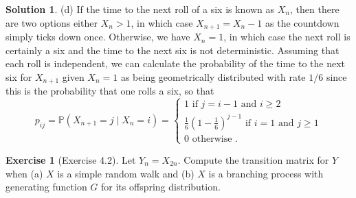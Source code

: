 \documentclass[12pt]{article}
\newcommand{\Prob}{\mathbb{P}}
\theoremstyle{definition}
\newtheorem{exer}{Exercise}
\newtheorem{sol}{Solution}
\theoremstyle{remark}
\begin{document}
\begin{sol}
(d) If the time to the next roll of a six is known as $X_{n}$, then there are two options either $X_{n} > 1$, in which case $X_{n+1} = X_{n} - 1$ as the countdown simply ticks down once. Otherwise, we have $X_{n} = 1$, in which case the next roll is certainly a six and the time to the next six is not deterministic. Assuming that each roll is independent, we can calculate the probability of the time to the next six for $X_{n+1}$ given $X_{n} = 1$ as being geometrically distributed with rate $1 / 6$ since this is the probability that one rolls a six, so that
\begin{equation*}
    p_{ij} = \Prob(X_{n+1} = j \mid X_{n} = i) 
    =
    \begin{cases}
        1 \text{ if } j = i - 1 \text{ and } i\geq 2\\
        \frac{1}{6} \left(1 - \frac{1}{6}\right)^{j-1} \text{ if } i = 1 \text{ and } j\geq 1 \\
        0 \text{ otherwise }.
    \end{cases}
\end{equation*}
\end{sol}

  \newpage

\begin{exer}[Exercise 4.2]
    Let $Y_{n} = X_{2n}$. Compute the transition matrix for $Y$ when (a) $X$ is a simple random walk and (b) $X$ is a branching process with generating function $G$ for its offspring distribution.
\end{exer}
\end{document}
